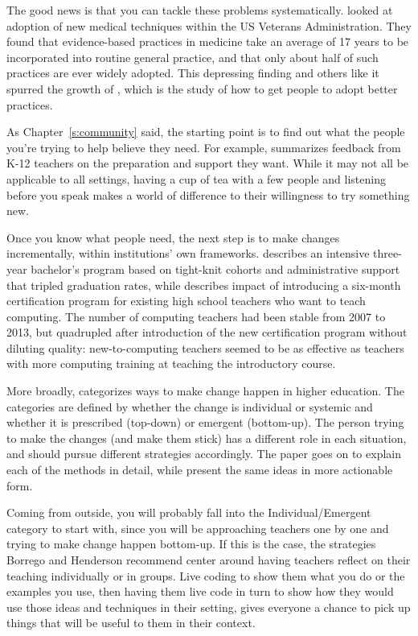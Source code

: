 The good news is that you can tackle these problems systematically.
\cite{Baue2015} looked at adoption of new medical techniques within the US Veterans Administration.
They found that evidence-based practices in medicine
take an average of 17 years to be incorporated into routine general practice,
and that only about half of such practices are ever widely adopted.
This depressing finding and others like it spurred the growth of
,
which is the study of how to get people to adopt better practices.

As Chapter~\ref{s:community} said,
the starting point is to find out what the people you're trying to help believe they need.
For example,
\cite{Yada2016} summarizes feedback from K-12 teachers on the preparation and support they want.
While it may not all be applicable to all settings,
having a cup of tea with a few people and listening before you speak
makes a world of difference to their willingness to try something new.

Once you know what people need,
the next step is to make changes incrementally,
within institutions' own frameworks.
\cite{Nara2018} describes an intensive three-year bachelor's program
based on tight-knit cohorts and administrative support
that tripled graduation rates,
while \cite{Hu2017} describes impact of introducing a six-month certification program
for existing high school teachers who want to teach computing.
The number of computing teachers had been stable from 2007 to 2013,
but quadrupled after introduction of the new certification program
without diluting quality:
new-to-computing teachers seemed to be as effective as teachers with more computing training
at teaching the introductory course.

More broadly,
\cite{Borr2014} categorizes ways to make change happen in higher education.
The categories are defined by whether the change is individual or systemic
and whether it is prescribed (top-down) or emergent (bottom-up).
The person trying to make the changes (and make them stick)
has a different role in each situation,
and should pursue different strategies accordingly.
The paper goes on to explain each of the methods in detail,
while \cite{Hend2015a,Hend2015b} present the same ideas in more actionable form.

Coming from outside,
you will probably fall into the Individual/Emergent category to start with,
since you will be approaching teachers one by one
and trying to make change happen bottom-up.
If this is the case,
the strategies Borrego and Henderson recommend center around
having teachers reflect on their teaching individually or in groups.
Live coding to show them what you do or the examples you use,
then having them live code in turn
to show how they would use those ideas and techniques in their setting,
gives everyone a chance to pick up things that will be useful to them in their context.

